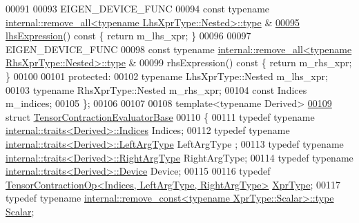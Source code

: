 \begin{DoxyCode}
00091 
00093   EIGEN\_DEVICE\_FUNC
00094   \textcolor{keyword}{const} \textcolor{keyword}{typename} \hyperlink{group___sparse_core___module}{internal::remove\_all<typename LhsXprType::Nested>::type}
      &
\hyperlink{class_eigen_1_1_tensor_contraction_op_a1e3bb92babac5554f7164b12e9654daa}{00095}   \hyperlink{class_eigen_1_1_tensor_contraction_op_a1e3bb92babac5554f7164b12e9654daa}{lhsExpression}()\textcolor{keyword}{ const }\{ \textcolor{keywordflow}{return} m\_lhs\_xpr; \}
00096 
00097   EIGEN\_DEVICE\_FUNC
00098   \textcolor{keyword}{const} \textcolor{keyword}{typename} \hyperlink{group___sparse_core___module}{internal::remove\_all<typename RhsXprType::Nested>::type}
      &
00099   rhsExpression()\textcolor{keyword}{ const }\{ \textcolor{keywordflow}{return} m\_rhs\_xpr; \}
00100 
00101   \textcolor{keyword}{protected}:
00102     \textcolor{keyword}{typename} LhsXprType::Nested m\_lhs\_xpr;
00103     \textcolor{keyword}{typename} RhsXprType::Nested m\_rhs\_xpr;
00104     \textcolor{keyword}{const} Indices m\_indices;
00105 \};
00106 
00107 
00108 \textcolor{keyword}{template}<\textcolor{keyword}{typename} Derived>
\hyperlink{struct_eigen_1_1_tensor_contraction_evaluator_base}{00109} \textcolor{keyword}{struct }\hyperlink{struct_eigen_1_1_tensor_contraction_evaluator_base}{TensorContractionEvaluatorBase}
00110 \{
00111   \textcolor{keyword}{typedef} \textcolor{keyword}{typename} \hyperlink{struct_eigen_1_1internal_1_1traits}{internal::traits<Derived>::Indices} Indices;
00112   \textcolor{keyword}{typedef} \textcolor{keyword}{typename} \hyperlink{struct_eigen_1_1internal_1_1traits}{internal::traits<Derived>::LeftArgType} LeftArgType
      ;
00113   \textcolor{keyword}{typedef} \textcolor{keyword}{typename} \hyperlink{struct_eigen_1_1internal_1_1traits}{internal::traits<Derived>::RightArgType} 
      RightArgType;
00114   \textcolor{keyword}{typedef} \textcolor{keyword}{typename} \hyperlink{struct_eigen_1_1internal_1_1traits}{internal::traits<Derived>::Device} Device;
00115 
00116   \textcolor{keyword}{typedef} \hyperlink{class_eigen_1_1_tensor_contraction_op}{TensorContractionOp<Indices, LeftArgType, RightArgType>}
       \hyperlink{class_eigen_1_1_tensor_contraction_op}{XprType};
00117   \textcolor{keyword}{typedef} \textcolor{keyword}{typename} \hyperlink{group___sparse_core___module}{internal::remove\_const<typename XprType::Scalar>::type}
       \hyperlink{group___sparse_core___module}{Scalar};

\end{DoxyCode}
